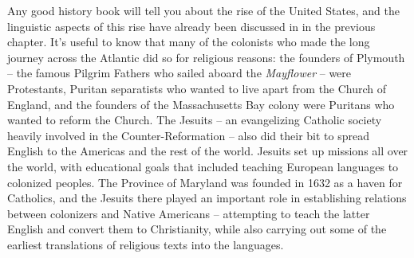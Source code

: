 Any good history book will tell you about the rise of the United States, and the linguistic aspects of this rise have already been discussed in  in the previous chapter. It's useful to know that many of the colonists who made the long journey across the Atlantic did so for religious reasons: the founders of Plymouth -- the famous Pilgrim Fathers who sailed aboard the \textit{Mayflower} -- were Protestants, Puritan separatists who wanted to live apart from the Church of England, and the founders of the Massachusetts Bay colony were Puritans who wanted to reform the Church. The Jesuits -- an evangelizing Catholic society heavily involved in the Counter-Reformation -- also did their bit to spread English to the Americas and the rest of the world. Jesuits set up missions all over the world, with educational goals that included teaching European languages to colonized peoples. The Province of Maryland was founded in 1632 as a haven for Catholics, and the Jesuits there played an important role in establishing relations between colonizers and Native Americans -- attempting to teach the latter English and convert them to Christianity, while also carrying out some of the earliest translations of religious texts into the  languages.



